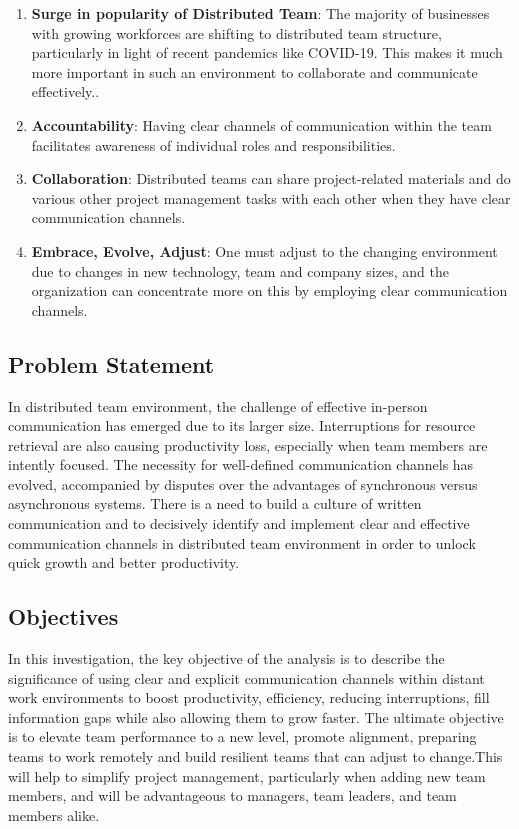 \documentclass[runningheads]{llncs}
\begin{document}
    \begin{enumerate}
        \item \textbf{Surge in popularity of Distributed Team}: The majority of businesses with growing workforces are shifting to distributed team structure, particularly in light of recent pandemics like COVID-19. This makes it much more important in such an environment to collaborate and communicate effectively.. 
        \item \textbf{Accountability}: Having clear channels of communication within the team facilitates awareness of individual roles and responsibilities.
        \item \textbf{Collaboration}: Distributed teams can share project-related materials and do various other project management tasks with each other when they have clear communication channels. 
        \item \textbf{Embrace, Evolve, Adjust}: One must adjust to the changing environment due to changes in new technology, team and company sizes, and the organization can concentrate more on this by employing clear communication channels.
    \end{enumerate}
    
    \subsection{Problem Statement} In distributed team environment, the challenge of effective in-person communication has emerged due to its larger size. Interruptions for resource retrieval are also causing productivity loss, especially when team members are intently focused. The necessity for well-defined communication channels has evolved, accompanied by disputes over the advantages of synchronous versus asynchronous systems. There is a need to build a culture of written communication and to decisively identify and implement clear and effective communication channels in distributed team environment in order to unlock quick growth and better productivity.~\cite{refbook1}

    \subsection{Objectives} In this investigation, the key objective of the analysis is to describe the significance of using clear and explicit communication channels within distant work environments to boost productivity, efficiency, reducing interruptions, fill information gaps while also allowing them to grow faster. The ultimate objective is to elevate team performance to a new level, promote alignment, preparing teams to work remotely and build resilient teams that can adjust to change.This will help to simplify project management, particularly when adding new team members, and will be advantageous to managers, team leaders, and team members alike. ~\cite{refbook1}
\end{document}
